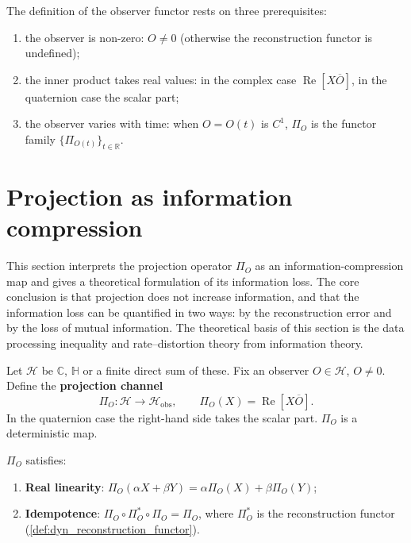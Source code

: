 \begin{remark}\label{rem:dyn_observer_functor_scope}
The definition of the observer functor rests on three prerequisites:
\begin{enumerate}[label=(\roman*)]
    \item the observer is non-zero: $O\neq 0$ (otherwise the reconstruction functor is undefined);
    \item the inner product takes real values: in the complex case $\operatorname{Re}[X\overline O]$, in the quaternion case the scalar part;
    \item the observer varies with time: when $O=O(t)$ is $C^1$, $\Pi_O$ is the functor family $\{\Pi_{O(t)}\}_{t\in\mathbb R}$.
\end{enumerate}
\end{remark}

\section{Projection as information compression}
\label{sec:dyn_projection_information}

This section interprets the projection operator $\Pi_O$ as an information-compression map and gives a theoretical formulation of its information loss. The core conclusion is that projection does not increase information, and that the information loss can be quantified in two ways: by the reconstruction error and by the loss of mutual information. The theoretical basis of this section is the data processing inequality and rate--distortion theory from information theory.

\begin{definition}\label{def:dyn_projection_channel}
Let $\mathcal H$ be $\mathbb C$, $\mathbb H$ or a finite direct sum of these. Fix an observer $O\in\mathcal H$, $O\neq 0$. Define the \textbf{projection channel}
\[
\Pi_O:\mathcal H\to\mathcal H_{\text{obs}},\qquad
\Pi_O(X)=\operatorname{Re}[X\overline O].
\]
In the quaternion case the right-hand side takes the scalar part. $\Pi_O$ is a deterministic map.
\end{definition}

\begin{proposition}\label{prop:dyn_projection_idempotent}
$\Pi_O$ satisfies:
\begin{enumerate}[label=(\roman*)]
    \item \textbf{Real linearity}: $\Pi_O(\alpha X+\beta Y)=\alpha\Pi_O(X)+\beta\Pi_O(Y)$;
    \item \textbf{Idempotence}: $\Pi_O\circ\Pi_O^\ast\circ\Pi_O=\Pi_O$, where $\Pi_O^\ast$ is the reconstruction functor (\cref{def:dyn_reconstruction_functor}).
\end{enumerate}
\end{proposition}


